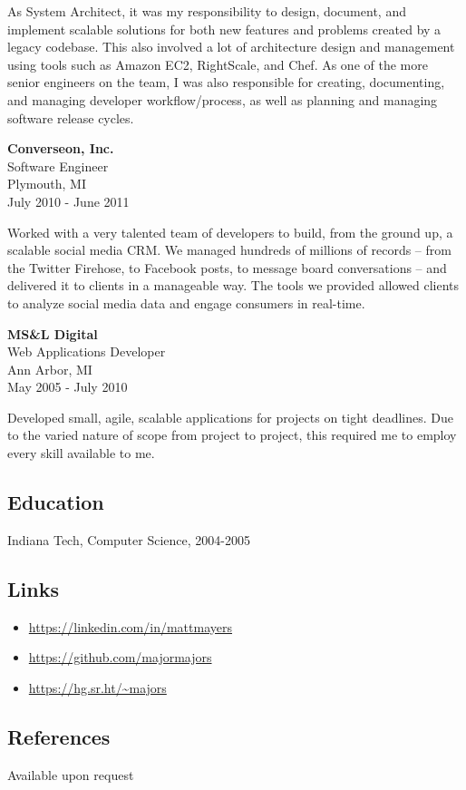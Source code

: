 \documentclass[
]{article}
\providecommand{\tightlist}{%
  \setlength{\itemsep}{0pt}\setlength{\parskip}{0pt}}
\begin{document}
As System Architect, it was my responsibility to design, document, and
implement scalable solutions for both new features and problems created
by a legacy codebase. This also involved a lot of architecture design
and management using tools such as Amazon EC2, RightScale, and Chef. As
one of the more senior engineers on the team, I was also responsible for
creating, documenting, and managing developer workflow/process, as well
as planning and managing software release cycles.

\textbf{Converseon, Inc.}\\
Software Engineer\\
Plymouth, MI\\
July 2010 - June 2011

Worked with a very talented team of developers to build, from the ground
up, a scalable social media CRM. We managed hundreds of millions of
records -- from the Twitter Firehose, to Facebook posts, to message
board conversations -- and delivered it to clients in a manageable way.
The tools we provided allowed clients to analyze social media data and
engage consumers in real-time.

\textbf{MS\&L Digital}\\
Web Applications Developer\\
Ann Arbor, MI\\
May 2005 - July 2010

Developed small, agile, scalable applications for projects on tight
deadlines. Due to the varied nature of scope from project to project,
this required me to employ every skill available to me.

\subsection{Education}\label{education}

Indiana Tech, Computer Science, 2004-2005

\subsection{Links}\label{links}

\begin{itemize}
\tightlist
\item
  \url{https://linkedin.com/in/mattmayers}
\item
  \url{https://github.com/majormajors}
\item
  \url{https://hg.sr.ht/~majors}
\end{itemize}

\subsection{References}\label{references}

Available upon request
\end{document}
